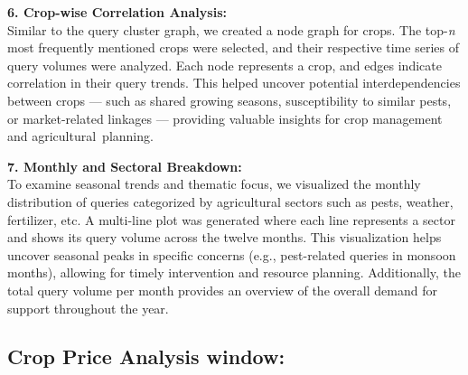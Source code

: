 \documentclass[a4paper, 12pt]{article}
\begin{document}
\vspace{0.5em}
\textbf{6. Crop-wise Correlation Analysis:} \\
Similar to the query cluster graph, we created a node graph for crops. The top-\textit{n} most frequently mentioned crops were selected, and their respective time series of query volumes were analyzed. Each node represents a crop, and edges indicate correlation in their query trends. This helped uncover potential interdependencies between crops — such as shared growing seasons, susceptibility to similar pests, or market-related linkages — providing valuable insights for crop management and agricultural planning.

\vspace{0.5em}
\textbf{7. Monthly and Sectoral Breakdown:} \\
To examine seasonal trends and thematic focus, we visualized the monthly distribution of queries categorized by agricultural sectors such as pests, weather, fertilizer, etc. A multi-line plot was generated where each line represents a sector and shows its query volume across the twelve months. This visualization helps uncover seasonal peaks in specific concerns (e.g., pest-related queries in monsoon months), allowing for timely intervention and resource planning. Additionally, the total query volume per month provides an overview of the overall demand for support throughout the year.

\vspace{0.5em}
\subsection{Crop Price Analysis window:}
\end{document}
